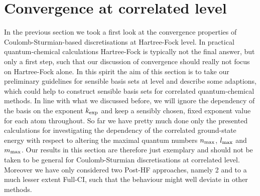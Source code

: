 \section{Convergence at correlated level}


In the previous section we took a first look at the convergence
properties of Coulomb-Sturmian-based discretisations at Hartree-Fock level.
In practical quantum-chemical calculations Hartree-Fock is typically
not the final answer,
but only a first step,
such that our discussion of convergence should really not focus on Hartree-Fock alone.
In this spirit the aim of this section is to take our preliminary guidelines
for sensible basis sets at \HF level and describe some adaptions,
which could help to construct sensible \CS basis sets for correlated
quantum-chemical methods.
In line with what we discussed before, we will ignore the dependency
of the \CS basis on the exponent $k_\text{exp}$ and keep a sensibly chosen,
fixed exponent value for each atom throughout.
So far we have pretty much done only the presented calculations
for investigating the dependency of the correlated ground-state energy
with respect to altering the maximal quantum numbers $n_\text{max}$, $l_\text{max}$ and $m_\text{max}$.
Our results in this section are therefore just exemplary
and should not be taken to be general for Coulomb-Sturmian discretisations
at correlated level.
Moreover we have only considered two Post-HF approaches,
namely {\MP}2 and to a much lesser extent Full-CI,
such that the behaviour might well deviate in other methods.

